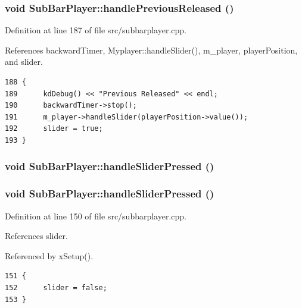 \subsubsection{\setlength{\rightskip}{0pt plus 5cm}void Sub\-Bar\-Player::handle\-Previous\-Released ()\hspace{0.3cm}{\tt  [slot]}}\label{classSubBarPlayer_SubBarPlayeri7}




Definition at line 187 of file src/subbarplayer.cpp.

References backward\-Timer, Myplayer::handle\-Slider(), m\_\-player, player\-Position, and slider.



\footnotesize\begin{verbatim}188 {
189      kdDebug() << "Previous Released" << endl;
190      backwardTimer->stop();
191      m_player->handleSlider(playerPosition->value());
192      slider = true;
193 }
\end{verbatim}\normalsize 
{}
\subsubsection{\setlength{\rightskip}{0pt plus 5cm}void Sub\-Bar\-Player::handle\-Slider\-Pressed ()\hspace{0.3cm}{\tt  [slot]}}\label{classSubBarPlayer_SubBarPlayeri21}


\subsubsection{\setlength{\rightskip}{0pt plus 5cm}void Sub\-Bar\-Player::handle\-Slider\-Pressed ()\hspace{0.3cm}{\tt  [slot]}}\label{classSubBarPlayer_SubBarPlayeri3}




Definition at line 150 of file src/subbarplayer.cpp.

References slider.

Referenced by x\-Setup().



\footnotesize\begin{verbatim}151 {
152      slider = false;
153 }
\end{verbatim}\normalsize 
{}
